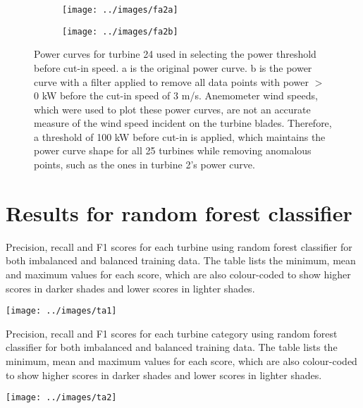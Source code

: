 \begin{figure}
  \centering
  \begin{subfigure}[t]{.5\textwidth}
    \centering
    \texttt{[image: ../images/fa2a]}
    \caption{}
  \end{subfigure}
  \begin{subfigure}[t]{.5\textwidth}
    \centering
    \texttt{[image: ../images/fa2b]}
    \caption{}
  \end{subfigure}
  \captionsetup{labelformat=empty,list=no}
  \caption{Power curves for turbine 24 used in selecting the power threshold
  before cut-in speed. a is the original power curve. b is the power curve
  with a filter applied to remove all data points with power $>$ 0 kW before
  the cut-in speed of 3 m/s. Anemometer wind speeds, which were used to plot
  these power curves, are not an accurate measure of the wind speed incident
  on the turbine blades. Therefore, a threshold of 100 kW before cut-in is
  applied, which maintains the power curve shape for all 25 turbines while
  removing anomalous points, such as the ones in turbine 2's power curve.}
\end{figure}

\chapter{Results for random forest classifier}\label{a3}

\begin{landscape}
  \begin{table}
    \centering
    \captionsetup{labelformat=empty,list=no}
    \caption{Precision, recall and F1 scores for each turbine using random
    forest classifier for both imbalanced and balanced training data. The
    table lists the minimum, mean and maximum values for each score, which are
    also colour-coded to show higher scores in darker shades and lower scores
    in lighter shades.}
    \texttt{[image: ../images/ta1]}
  \end{table}
\end{landscape}

\begin{table}
  \centering
  \captionsetup{labelformat=empty,list=no}
  \caption{Precision, recall and F1 scores for each turbine category using
  random forest classifier for both imbalanced and balanced training data. The
  table lists the minimum, mean and maximum values for each score, which are
  also colour-coded to show higher scores in darker shades and lower scores in
  lighter shades.}
  \texttt{[image: ../images/ta2]}
\end{table}

